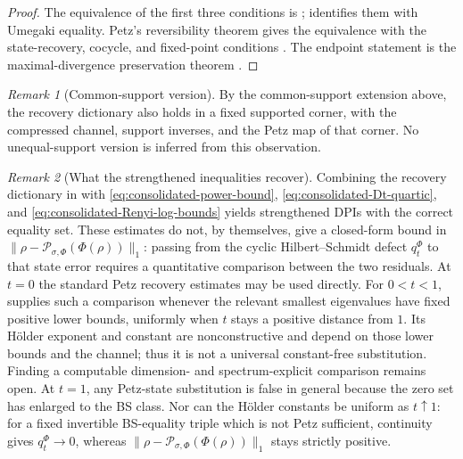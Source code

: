 \documentclass[11pt]{article}
\theoremstyle{remark}
\newtheorem{remark}[remark]{Remark}
\newcommand{\1}{\mathbbm{1}}
\begin{document}
\begin{proof}
The equivalence of the first three conditions is
;
 identifies them with
Umegaki equality.  Petz's reversibility theorem gives the equivalence
with the state-recovery, cocycle, and fixed-point conditions
\cite[Theorem~3.18(i),(iii),(vi),(viii),(ix)]{hiai2017different}.
The endpoint statement is
the maximal-divergence preservation theorem
\cite[Theorem~3.34]{hiai2017different}.
\end{proof}

\begin{remark}[Common-support version]
By the common-support extension above, the recovery dictionary also
holds in a fixed supported corner, with the compressed channel,
support inverses, and the Petz map of that corner.  No unequal-support
version is inferred from this observation.
\end{remark}

\begin{remark}[What the strengthened inequalities recover]
\label{rem:consolidated-strengthened-Petz-scope}
Combining the recovery dictionary in
 with
\eqref{eq:consolidated-power-bound},
\eqref{eq:consolidated-Dt-quartic}, and
\eqref{eq:consolidated-Renyi-log-bounds} yields strengthened DPIs with
the correct equality set.  These estimates do not, by themselves,
give a closed-form bound in
$\lVert\rho-\mathcal P_{\sigma,\Phi}(\Phi(\rho))\rVert_1$: passing
from the cyclic Hilbert--Schmidt defect $q_t^\Phi$ to that state
error requires a quantitative comparison between the two residuals.
At $t=0$ the standard Petz recovery estimates may be used directly.
For $0<t<1$,  supplies
such a comparison whenever the relevant smallest eigenvalues have
fixed positive lower bounds, uniformly
when $t$ stays a positive distance from $1$.  Its H\"older exponent and
constant are nonconstructive and depend on those lower bounds and the channel;
thus it is not a universal constant-free substitution.  Finding a
computable dimension- and spectrum-explicit comparison remains open.
At $t=1$, any Petz-state substitution is false in general because the
zero set has enlarged to the BS class.  Nor can the H\"older constants
be uniform as $t\uparrow1$: for a fixed invertible BS-equality triple
which is not Petz sufficient, continuity gives $q_t^\Phi\to0$, whereas
$\lVert\rho-\mathcal P_{\sigma,\Phi}(\Phi(\rho))\rVert_1$ stays
strictly positive.
\end{remark}
\end{document}
